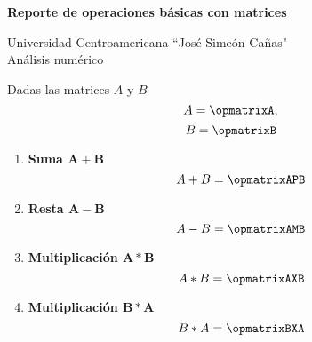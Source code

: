 \documentclass{article}
\newenvironment{fmpage}[1]
{\begin{lrbox}{\fmbox}\begin{minipage}{#1}}
{\end{minipage}\end{lrbox}\fbox{\usebox{\fmbox}}}
\begin{document}
\begin{center}
\begin{minipage}{\linewidth}
\vspace{-0.5cm}
\begin{fmpage}{\linewidth}
\vspace{0.5cm}
\begin{wrapfigure}{r}{0.1\textwidth}
\vspace{-1.2cm}

\centering
\end{wrapfigure}
\LARGE{\textbf {Reporte de operaciones b\'asicas con matrices}}

\vspace{0.5cm}
\large{Universidad Centroamericana ``Jos\'e Sime\'on Ca\~nas"} \\
\large{An\'alisis num\'erico}
\vspace{0.5cm}
\end{fmpage}
\vspace{1cm}
\end{minipage}
\end{center}


\large{Dadas las matrices $A$ y $B$}
\[
A=
\opmatrixA
,
\]
\[
B=
\opmatrixB
\]
\begin{enumerate}
\item \large{\textbf{Suma $\mathbf{A} + \mathbf{B}$}}
\[
A + B=
\opmatrixAPB
\]
\item \large{\textbf{Resta $\mathbf{A} - \mathbf{B}$}}
\[
A - B=
\opmatrixAMB
\]
\item \large{\textbf{Multiplicaci\'on $\mathbf{A} * \mathbf{B}$}}
\[
A * B=
\opmatrixAXB
\]
\item \large{\textbf{Multiplicaci\'on $\mathbf{B} * \mathbf{A}$}}
\[
B * A=
\opmatrixBXA
\]
\end{enumerate}
\end{document}
